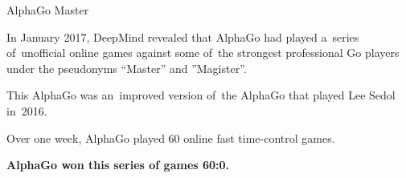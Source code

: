 \documentclass{beamer}
\begin{document}
  {
    \begin{frame}{AlphaGo Master}
      \pause

      \color{white}
      In January 2017, DeepMind revealed that AlphaGo had played a~series of~unofficial online games against some of~the strongest professional Go players under the pseudonyms ``Master'' and ''Magister''.
      \pause

      This AlphaGo was an~improved version of~the AlphaGo that played Lee Sedol in~2016.
      \pause

      Over one week, AlphaGo played 60 online fast time-control games.
      \pause

      \textbf{AlphaGo won this series of games 60:0.}
    \end{frame}
  }
\end{document}
